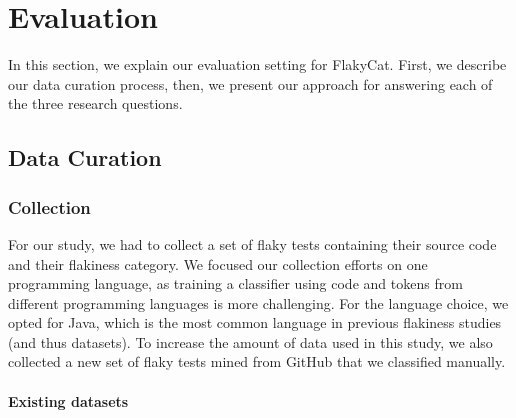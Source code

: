 \section{Evaluation}
\label{sec:flakycat-evaluation}

In this section, we explain our evaluation setting for FlakyCat.
First, we describe our data curation process, then, we present our approach for answering each of the three research questions. 

\subsection{Data Curation}
\label{dataset}

\subsubsection{Collection}
For our study, we had to collect a set of flaky tests containing their source code and their flakiness category.
We focused our collection efforts on one programming language, as training a classifier using code and tokens from different programming languages is more challenging. 
For the language choice, we opted for Java, which is the most common language in previous flakiness studies (and thus datasets). 
To increase the amount of data used in this study, we also collected a new set of flaky tests mined from GitHub that we classified manually.

\paragraph{Existing datasets} 


